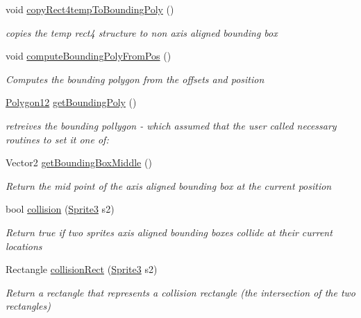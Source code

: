 \begin{DoxyCompactItemize}
void \mbox{\hyperlink{class_r_c___framework_1_1_sprite3_af5a02783f1305245a178fbe1cc1cc47a}{copy\+Rect4temp\+To\+Bounding\+Poly}} ()
\begin{DoxyCompactList}\small\item\em copies the temp rect4 structure to non axis aligned bounding box ~\newline
\end{DoxyCompactList}\item 
void \mbox{\hyperlink{class_r_c___framework_1_1_sprite3_ab430c66998577533366d5e4b1b85e2f4}{compute\+Bounding\+Poly\+From\+Pos}} ()
\begin{DoxyCompactList}\small\item\em Computes the bounding polygon from the offsets and position \end{DoxyCompactList}\item 
\mbox{\hyperlink{class_r_c___framework_1_1_polygon12}{Polygon12}} \mbox{\hyperlink{class_r_c___framework_1_1_sprite3_afd66805a5662cad934b912d4b204819d}{get\+Bounding\+Poly}} ()
\begin{DoxyCompactList}\small\item\em retreives the bounding pollygon -\/ which assumed that the user called necessary routines to set it one of\+: \end{DoxyCompactList}\item 
Vector2 \mbox{\hyperlink{class_r_c___framework_1_1_sprite3_a01208614a05673dd6b6d747910394657}{get\+Bounding\+Box\+Middle}} ()
\begin{DoxyCompactList}\small\item\em Return the mid point of the axis aligned bounding box at the current position \end{DoxyCompactList}\item 
bool \mbox{\hyperlink{class_r_c___framework_1_1_sprite3_a91ecfec14fcf4e3d45968c46f17fd83b}{collision}} (\mbox{\hyperlink{class_r_c___framework_1_1_sprite3}{Sprite3}} s2)
\begin{DoxyCompactList}\small\item\em Return true if two sprites axis aligned bounding boxes collide at their current locations \end{DoxyCompactList}\item 
Rectangle \mbox{\hyperlink{class_r_c___framework_1_1_sprite3_a50c663717778826a66395efd510aec62}{collision\+Rect}} (\mbox{\hyperlink{class_r_c___framework_1_1_sprite3}{Sprite3}} s2)
\begin{DoxyCompactList}\small\item\em Return a rectangle that represents a collision rectangle (the intersection of the two rectangles)\end{DoxyCompactList}\item 

\end{DoxyCompactItemize}
